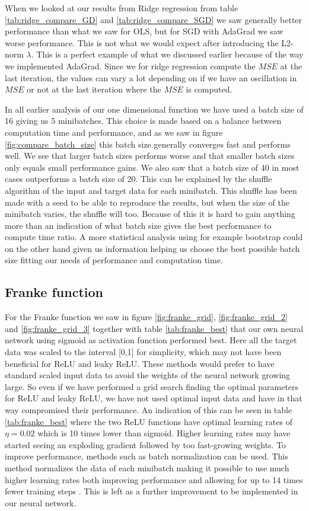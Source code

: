 \documentclass[11pt]{article}
\begin{document}
When we looked at our results from Ridge regression from table \ref{tab:ridge_compare_GD} and \ref{tab:ridge_compare_SGD} we saw generally better performance than what we saw for OLS, but for SGD with AdaGrad we saw worse performance. This is not what we would expect after introducing the L2-norm $\lambda$. This is a perfect example of what we discussed earlier because of the way we implemented AdaGrad. Since we for ridge regression compute the $MSE$ at the last iteration, the values can vary a lot depending on if we have an oscillation in $MSE$ or not at the last iteration where the $MSE$ is computed.


In all earlier analysis of our one dimensional function we have used a batch size of 16 giving us 5 minibatches. This choice is made based on a balance between computation time and performance, and as we saw in figure \ref{fig:compare_batch_size} this batch size generally converges fast and performs well. We see that larger batch sizes performs worse and that smaller batch sizes only equals small performance gains. We also saw that a batch size of 40 in most cases outperforms a batch size of 20. This can be explained by the shuffle algorithm of the input and target data for each minibatch. This shuffle has been made with a seed to be able to reproduce the results, but when the size of the minibatch varies, the shuffle will too. Because of this it is hard to gain anything more than an indication of what batch size gives the best performance to compute time ratio. A more statistical analysis using for example bootstrap could on the other hand given us information helping us choose the best possible batch size fitting our needs of performance and computation time.

\subsection{Franke function}
For the Franke function we saw in figure \ref{fig:franke_grid}, \ref{fig:franke_grid_2} and \ref{fig:franke_grid_3} together with table \ref{tab:franke_best} that our own neural network using sigmoid as activation function performed best. Here all the target data was scaled to the interval [0,1] for simplicity, which may not have been beneficial for ReLU and leaky ReLU. These methods would prefer to have standard scaled input data \cite{deeplearning} to avoid the weights of the neural network growing large. So even if we have performed a grid search finding the optimal parameters for ReLU and leaky ReLU, we have not used optimal input data and have in that way compromised their performance. An indication of this can be seen in table \ref{tab:franke_best} where the two ReLU functions have optimal learning rates of $\eta=0.02$ which is 10 times lower than sigmoid. Higher learning rates may have started seeing an exploding gradient followed by too fast-growing weights. To improve performance, methods such as batch normalization can be used. This method normalizes the data of each minibatch making it possible to use much higher learning rates both improving performance and allowing for up to 14 times fewer training steps \cite{batchnormalization}. This is left as a further improvement to be implemented in our neural network.
\end{document}
